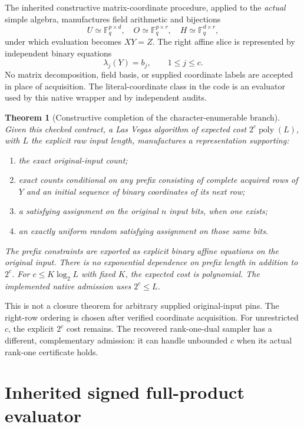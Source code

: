 \documentclass[11pt]{article}
\newtheorem{theorem}{Theorem}
\newcommand{\F}{\mathbb F}
\begin{document}
The inherited constructive matrix-coordinate procedure, applied to the
\emph{actual} simple algebra, manufactures field arithmetic and bijections
\[
 U\simeq\F_q^{p\times d},\quad O\simeq\F_q^{p\times r},\quad
 H\simeq\F_q^{d\times r},
\]
under which evaluation becomes $XY=Z$. The right affine slice is represented
by independent binary equations
\[
 \lambda_j(Y)=b_j,\qquad 1\le j\le c.                     \tag{2}
\]
No matrix decomposition, field basis, or supplied coordinate labels are
accepted in place of acquisition. The literal-coordinate class in the code
is an evaluator used by this native wrapper and by independent audits.

\begin{theorem}[Constructive completion of the character-enumerable branch]
Given this checked contract, a Las Vegas algorithm of expected cost
$2^c\operatorname{poly}(L)$, with $L$ the explicit raw input length,
manufactures a representation supporting:
\begin{enumerate}
\item the exact original-input count;
\item exact counts conditional on any prefix consisting of complete acquired
      rows of $Y$ and an initial sequence of binary coordinates of its next row;
\item a satisfying assignment on the original $n$ input bits, when one exists;
\item an exactly uniform random satisfying assignment on those same bits.
\end{enumerate}
The prefix constraints are exported as explicit binary affine equations on
the original input. There is no exponential dependence on prefix length in
addition to $2^c$. For $c\le K\log_2 L$ with fixed $K$, the expected cost is
polynomial. The implemented native admission uses $2^c\le L$.
\end{theorem}

This is not a closure theorem for arbitrary supplied original-input pins.
The right-row ordering is chosen after verified coordinate acquisition.
For unrestricted $c$, the explicit $2^c$ cost remains. The recovered
rank-one-dual sampler has a different, complementary admission: it can handle
unbounded $c$ when its actual rank-one certificate holds.

\section{Inherited signed full-product evaluator}
\end{document}
